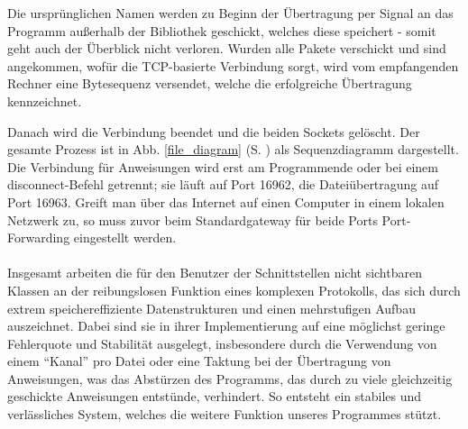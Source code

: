 Die ursprünglichen Namen werden zu Beginn der Übertragung per Signal an das Programm außerhalb der Bibliothek geschickt, welches diese speichert - somit geht auch der Überblick nicht verloren.
Wurden alle Pakete verschickt und sind angekommen, wofür die TCP-basierte Verbindung sorgt, wird vom empfangenden Rechner eine Bytesequenz versendet, welche die erfolgreiche Übertragung kennzeichnet.\\\par
Danach wird die Verbindung beendet und die beiden Sockets gelöscht.
Der gesamte Prozess ist in Abb. \ref{file_diagram} (S. \pageref{file_diagram}) als Sequenzdiagramm dargestellt.\\
Die Verbindung für Anweisungen wird erst am Programmende oder bei einem disconnect-Befehl getrennt; sie läuft auf Port 16962, die Dateiübertragung auf Port 16963.
Greift man über das Internet auf einen Computer in einem lokalen Netzwerk zu, so muss zuvor beim Standardgateway für beide Ports Port-Forwarding eingestellt werden.\\\\
Insgesamt arbeiten die für den Benutzer der Schnittstellen nicht sichtbaren Klassen an der reibungslosen Funktion eines komplexen Protokolls, das sich durch extrem speichereffiziente Datenstrukturen und einen mehrstufigen Aufbau auszeichnet.
Dabei sind sie in ihrer Implementierung auf eine möglichst geringe Fehlerquote und Stabilität ausgelegt, insbesondere durch die Verwendung von einem "`Kanal"' pro Datei oder eine Taktung bei der Übertragung von Anweisungen, was das Abstürzen des Programms, das durch zu viele gleichzeitig geschickte Anweisungen entstünde, verhindert.
So entsteht ein stabiles und verlässliches System, welches die weitere Funktion unseres Programmes stützt.
%